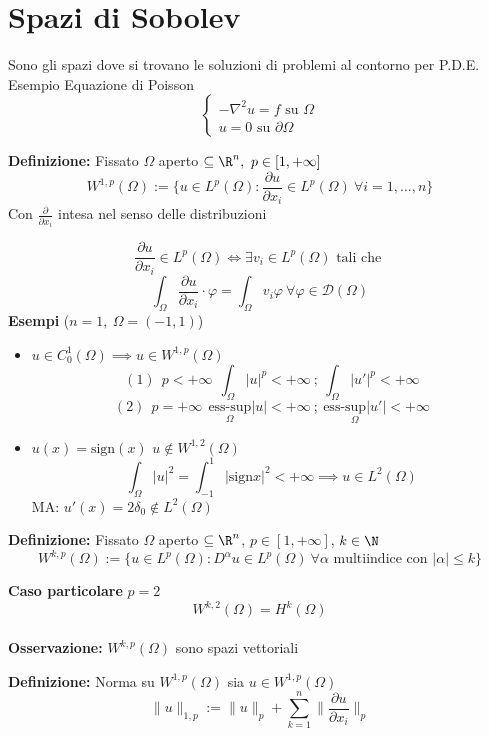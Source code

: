 \section{Spazi di Sobolev}
Sono gli spazi dove si trovano le soluzioni di problemi al contorno per P.D.E.
\\Esempio Equazione di Poisson
\[\begin{cases}
	-\nabla ^2u=f\text{ su }\Omega
	\\u=0\text{ su }\partial\Omega
\end{cases}\]
\begin{tcolorbox}
	\textbf{Definizione: }Fissato $\Omega$ aperto $\subseteq  \R^n,\ p\in [1,+\infty]$
	\[W^{1,p}(\Omega):=\{u\in L^p(\Omega): \frac{\partial u}{\partial x_i} \in L^p(\Omega)\ \forall i=1,\ldots,n \} \]
	Con $\frac{\partial }{\partial x_i }$ intesa nel senso delle distribuzioni
\end{tcolorbox}
\[\frac{\partial u}{\partial x_i} \in L^p(\Omega) \iff \exists v_i\in L^p(\Omega)\text{ tali che }\]
\[\int_{\Omega}^{} \frac{\partial u}{\partial x_i} \cdot \varphi=\int_{\Omega}^{}v_i\varphi\ \forall \varphi\in \mathcal D(\Omega) \]
\textbf{Esempi} ($n=1,\ \Omega=(-1,1)$)
\begin{itemize}
	\item $u\in C^1_0(\Omega)\implies u\in W^{1,p}(\Omega)$
		\[(1) \ \ p<+ \infty\ \ \int_{\Omega}^{} |u|^p<+\infty\ ;\ \int_{\Omega}^{} |u'|^p<+\infty\]
		\[(2)\ \ p=+\infty\ \ \underset{\Omega}{\text{ess-sup}}|u|<+\infty\ ;\ \underset{\Omega}{\text{ess-sup}|u'|}<+\infty\]
	\item $u(x)=\text{sign}(x)$ $u\not\in W^{1,2}(\Omega)$ 
		\[\int_{\Omega}^{} |u|^2=\int_{-1}^{1} |\text{sign}x|^2<+\infty\implies u\in L^2(\Omega)  \]
		MA: $u'(x)=2\delta_0\not\in L^{2}(\Omega)$
\end{itemize}
\begin{tcolorbox}
	\textbf{Definizione: }Fissato $\Omega$ aperto $\subseteq  \R^n$, $p\in [1,+\infty]$, $k\in \N$
	\[W^{k,p}(\Omega):=\{u\in L^p(\Omega):D^\alpha u\in L^{p}(\Omega)\ \forall \alpha\text{ multiindice con }|\alpha|\le k\} \]
	
\end{tcolorbox}
\textbf{Caso particolare} $p=2$ 
\[W^{k,2}(\Omega)=H^k(\Omega)\]
\\\textbf{Osservazione: }$W^{k,p}(\Omega)$ sono spazi vettoriali
\begin{tcolorbox}
	\textbf{Definizione:} Norma su $W^{1,p}(\Omega)$ sia $u\in W^{1,p}(\Omega)$ 
	\[\|u\|_{1,p}:=\|u\|_p+\sum_{k=1}^{n} \bigg\|\frac{\partial u}{\partial x_i} \bigg\|_p\]

\end{tcolorbox}
